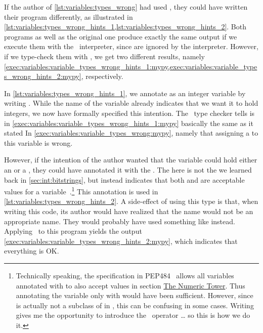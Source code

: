 If the author of \cref{lst:variables:types_wrong} had used , they could have written their program differently, as illustrated in \cref{lst:variables:types_wrong_hints_1,lst:variables:types_wrong_hints_2}.
Both programs as well as the original one produce exactly the same output if we execute them with the \python\ interpreter, since  are ignored by the interpreter.
However, if we type-check them with \mypy, we get two different results, namely \cref{exec:variables:variable_types_wrong_hints_1:mypy,exec:variables:variable_types_wrong_hints_2:mypy}, respectively.

In \cref{lst:variables:types_wrong_hints_1}, we annotate  as an integer variable by writing .
While the name of the variable already indicates that we want it to hold integers, we now have formally specified this intention.
The \mypy\ type checker tells is in \cref{exec:variables:variable_types_wrong_hints_1:mypy} basically the same as it stated In \cref{exec:variables:variable_types_wrong:mypy}, namely that assigning a  to this variable is wrong.

However, if the intention of the author wanted that the variable could hold either an  or a , they could have annotated it with the  .
The \pythonil{|} here is not the  we learned back in \cref{sec:int:bitstrings}, but instead indicates that both  and  are acceptable values for a variable~\cite{PEP604}.\footnote{%
Technically speaking, the  specification in PEP484~\cite{PEP484} allows all variables annotated with  to also accept  values in section \href{https://peps.python.org/pep-0484/\#the-numeric-tower}{The Numeric Tower}. %
Thus annotating the variable only with  would have been sufficient. %
However, since  is actually not a subclass of  in \python, this can be confusing in some cases. %
Writing  gives me the opportunity to introduce the \pythonil{|}~operator {\dots} so this is how we do it.%
}
This annotation is used in \cref{lst:variables:types_wrong_hints_2}.
A side-effect of using this type is that, when writing this code, its author would have realized that the name  would not be an appropriate name.
They would probably have used something like  instead.
Applying \mypy\ to this program yields the output \cref{exec:variables:variable_types_wrong_hints_2:mypy}, which indicates that everything is OK.

